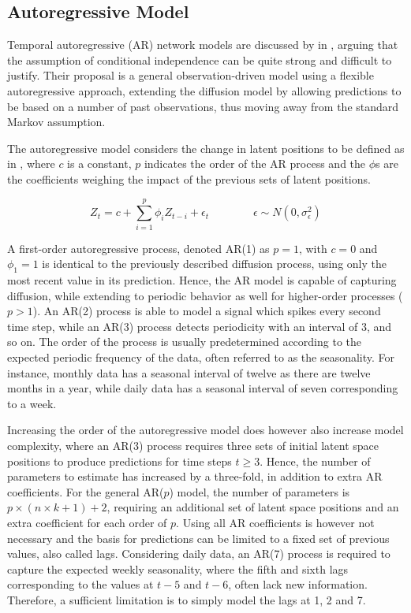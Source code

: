 \subsection{Autoregressive Model}

    Temporal autoregressive (AR) network models are discussed by \citeauthor{sewell2018simultaneous} in \cite{sewell2018simultaneous}, arguing that the assumption of conditional independence can be quite strong and difficult to justify. Their proposal is a general observation-driven model using a flexible autoregressive approach, extending the diffusion model by allowing predictions to be based on a number of past observations, thus moving away from the standard Markov assumption. 
    
    The autoregressive model considers the change in latent positions to be defined as in , where $c$ is a constant, $p$ indicates the order of the AR process and the $\phi$s are the coefficients weighing the impact of the previous sets of latent positions.
    
    \begin{equation}\label{eq:ar-model}
        Z_t = c + \sum_{i=1}^p \phi_i Z_{t-i} + \epsilon_t \qquad\qquad \epsilon \sim N(0,\sigma_\epsilon^2)
    \end{equation}
    
    A first-order autoregressive process, denoted AR(1) as $p=1$, with $c=0$ and $\phi_1=1$ is identical to the previously described diffusion process, using only the most recent value in its prediction. Hence, the AR model is capable of capturing diffusion, while extending to periodic behavior as well for higher-order processes ($p>1$). An AR(2) process is able to model a signal which spikes every second time step, while an AR(3) process detects periodicity with an interval of 3, and so on. The order of the process is usually predetermined according to the expected periodic frequency of the data, often referred to as the seasonality. For instance, monthly data has a seasonal interval of twelve as there are twelve months in a year, while daily data has a seasonal interval of seven corresponding to a week.
    
    Increasing the order of the autoregressive model does however also increase model complexity, where an AR(3) process requires three sets of initial latent space positions to produce predictions for time steps $t\geq3$. Hence, the number of parameters to estimate has increased by a three-fold, in addition to extra AR coefficients. For the general AR($p$) model, the number of parameters is $p\times (n\times k + 1) + 2$, requiring an additional set of latent space positions and an extra coefficient for each order of $p$.
    Using all AR coefficients is however not necessary and the basis for predictions can be limited to a fixed set of previous values, also called lags. Considering daily data, an AR(7) process is required to capture the expected weekly seasonality, where the fifth and sixth lags corresponding to the values at $t-5$ and $t-6$, often lack new information. Therefore, a sufficient limitation is to simply model the lags at 1, 2 and 7.
    
